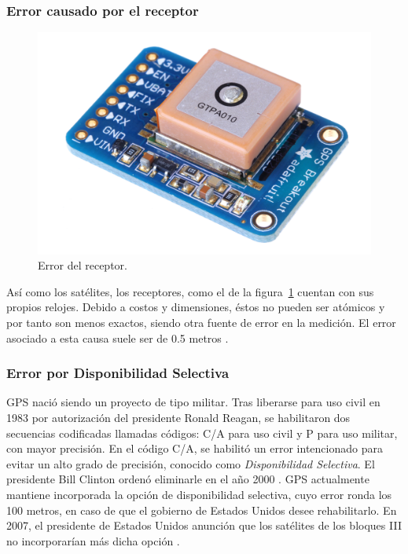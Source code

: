 \subsubsection{Error causado por el receptor}

\begin{figure}[H]
\centering
\includegraphics[scale=0.9]{Figures/disp}
\caption[Error del receptor.]{Error del receptor\footnotemark.}
\label{fig:ErrRec}
\end{figure}


Así como los satélites, los receptores, como el de la figura~\ref{fig:ErrRec} cuentan con sus propios relojes. Debido a costos y dimensiones, éstos no pueden ser atómicos y por tanto son menos exactos, siendo otra fuente de error en la medición. El error asociado a esta causa suele ser de 0.5 metros \citep{fallas2002sistema}.

\subsubsection{Error por Disponibilidad Selectiva}

GPS nació siendo un proyecto de tipo militar. Tras liberarse para uso civil en 1983 por autorización del presidente Ronald Reagan, se habilitaron dos secuencias codificadas llamadas códigos: C/A para uso civil y P para uso militar, con mayor precisión. En el código C/A, se habilitó un error intencionado para evitar un alto grado de precisión, conocido como \textit{Disponibilidad Selectiva}. El presidente Bill Clinton ordenó eliminarle en el año 2000 \citep{termal2014prototipo}. GPS actualmente mantiene incorporada la opción de disponibilidad selectiva, cuyo error ronda los 100 metros, en caso de que el gobierno de Estados Unidos desee rehabilitarlo. En 2007, el presidente de Estados Unidos anunción que los satélites de los bloques III no incorporarían más dicha opción \citep{chafer2017diseno}.

